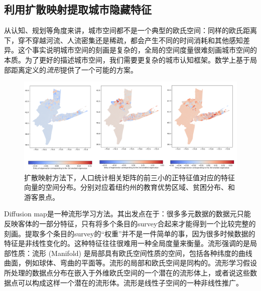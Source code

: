 \subsection{利用扩散映射提取城市隐藏特征}

从认知、规划等角度来讲，城市空间都不是一个典型的欧氏空间：同样的欧氏距离下，穿不穿越河流、人流密集还是稀疏，都会产生不同的时间消耗和其他感知差异。这个事实说明城市空间的刻画是复杂的，全局的空间度量很难刻画城市空间的本质。为了更好的描述城市空间，我们需要更复杂的城市认知框架。数学上基于局部距离定义的\textit{流形}提供了一个可能的方案。

\begin{figure}
    \centering
    \includegraphics[width = 0.99\linewidth]{Figs/diffusionmap.png}
    \caption{扩散映射方法下，人口统计相关矩阵的前三小的正特征值对应的特征向量的空间分布。分别对应着纽约州的教育优势区域、贫困分布、和游客景点。}
    \label{fig:diffusionmap}
\end{figure}

Diffusion map是一种流形学习方法。其出发点在于：很多多元数据的数据元只能反映客体的一部分特征，只有将多个条目的survey合起来才能得到一个比较完整的刻画。提取多个条目的survey的“权重”并不是一件简单的事，因为很多时候数据的特征是非线性变化的。这种特征往往很难用一种全局度量来衡量。流形强调的是局部性质：流形 (Manifold) 是局部具有欧氏空间性质的空间，包括各种纬度的曲线曲面，例如球体、弯曲的平面等。流形的局部和欧氏空间是同构的。流形学习假设所处理的数据点分布在嵌入于外维欧氏空间的一个潜在的流形体上，或者说这些数据点可以构成这样一个潜在的流形体。流形是线性子空间的一种非线性推广。

